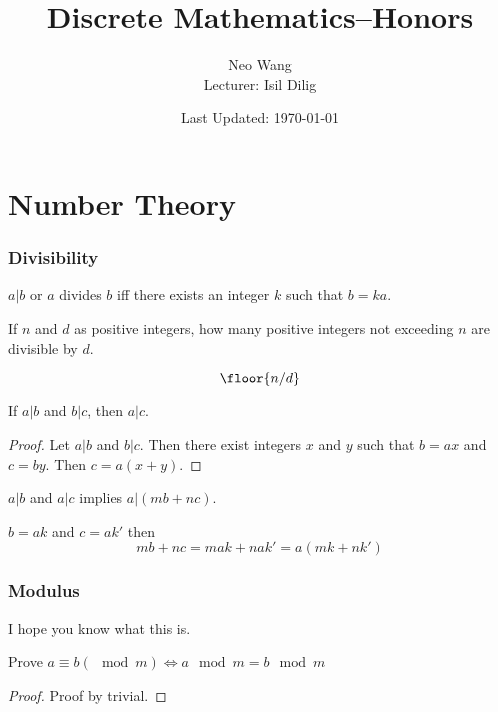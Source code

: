 \documentclass{scrreprt}
\title{Discrete Mathematics--Honors}
\author{Neo Wang\\ Lecturer: Isil Dilig}
\date{Last Updated: \today}
\begin{document}
\maketitle
\tableofcontents



\chapter{Number Theory}

\subsection{Divisibility}

\begin{definition}
    $a|b$ or $a$ divides $b$ iff there exists an integer $k$ such that $b=ka$.
\end{definition}

\begin{example}
    If $n$ and $d$ as positive integers, how many positive integers not exceeding $n$ are divisible by $d$.

    \[
        \floor{n/d}
    \]
\end{example}

\begin{example}
    If $a|b$ and $b|c$, then $a|c$.

    \begin{proof}
        Let $a|b$ and $b|c$. Then there exist integers $x$ and $y$ such that $b = ax$ and $c = by$. Then $c = a(x+y)$.
    \end{proof}
\end{example}

\begin{example}
    $a|b$ and $a|c$ implies $a|(mb + nc)$.

    $b=ak$ and $c=ak'$ then \[
        mb+nc=mak+nak'=a(mk+nk')
    \]
\end{example}

\subsection{Modulus}

I hope you know what this is.

\begin{example}
    Prove $a\equiv b (\mod m)\iff a\mod m = b \mod m$

    \begin{proof}
        Proof by trivial.
    \end{proof}
\end{example}
\end{document}
